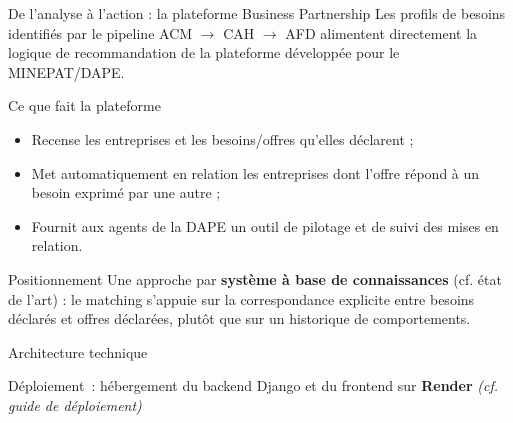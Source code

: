 \documentclass[aspectratio=169, 10pt]{beamer}
\begin{document}
\begin{frame}{De l'analyse à l'action : la plateforme Business Partnership}
    Les profils de besoins identifiés par le pipeline ACM $\to$ CAH $\to$ AFD alimentent directement la logique de recommandation de la plateforme développée pour le MINEPAT/DAPE.
    \vspace{6pt}
    \begin{block}{Ce que fait la plateforme}
        \begin{itemize}
            \item Recense les entreprises et les besoins/offres qu'elles déclarent ;
            \item Met automatiquement en relation les entreprises dont l'offre répond à un besoin exprimé par une autre ;
            \item Fournit aux agents de la DAPE un outil de pilotage et de suivi des mises en relation.
        \end{itemize}
    \end{block}
    \begin{alertblock}{Positionnement}
        Une approche par \textbf{système à base de connaissances} (cf. état de l'art) : le matching s'appuie sur la correspondance explicite entre besoins déclarés et offres déclarées, plutôt que sur un historique de comportements.
    \end{alertblock}
\end{frame}

\begin{frame}{Architecture technique}
    \centering
    \vspace{8pt}

    \small Déploiement~: hébergement du backend Django et du frontend sur \textbf{Render} \hfill \textit{(cf. guide de déploiement)}
\end{frame}
\end{document}
